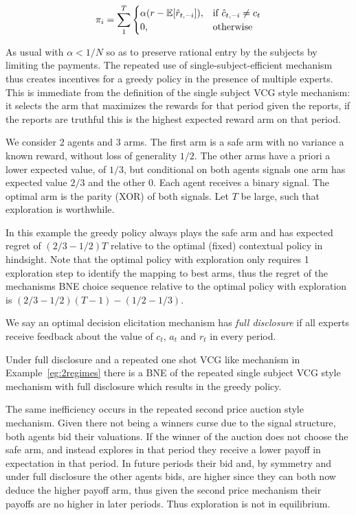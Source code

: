 \[
    \pi_i = \sum_1^T 
\begin{cases}
    \alpha (r - \expec[\hat{r}_{t,-i}]) ,& \text{if } \hat{c}_{t,-i} \neq c_t\\
    0,              & \text{otherwise}
\end{cases}
\]

As usual with $\alpha < 1/N$ so as to preserve rational entry by the subjects by limiting the payments.
The repeated use of single-subject-efficient mechanism thus creates incentives for a greedy policy in the presence of multiple experts.
This is immediate from the definition of the single subject VCG style mechanism: it selects the arm that maximizes the rewards for that period given the reports, if the reports are truthful this is the highest expected reward arm on that period.



\begin{eg}\label{eg:2regimes}
We consider 2 agents and 3 arms. The first arm is a safe arm with no variance a known reward, without loss of generality $1/2$. The other arms have a priori a lower expected value, of $1/3$, but conditional on both agents signals one arm has expected value $2/3$ and the other $0$. 
Each agent receives a binary signal. The optimal arm is the parity (XOR) of both signals. Let $T$ be large, such that exploration is worthwhile.
\end{eg}

In this example the greedy policy always plays the safe arm and has expected  regret of $(2/3 - 1/2)T$ relative to the optimal (fixed) contextual policy in hindsight.
 Note that the optimal policy with exploration only requires 1 exploration step to identify the mapping to best arms, thus the regret of the mechanisms BNE choice sequence relative to the optimal policy with exploration is $(2/3 - 1/2)(T-1) - (1/2-1/3) $. 

\begin{defn}
  We say an optimal decision elicitation mechanism has \emph{full disclosure} if all experts receive feedback about the value of $c_t$, $a_t$ and $r_t$ in every period.
 \end{defn}


Under full disclosure and a repeated one shot VCG like mechanism in Example~\ref{eg:2regimes} there is a BNE of the repeated single subject VCG style mechanism with full disclosure which results in the greedy policy.

The same inefficiency occurs in the repeated second price auction style mechanism.
Given there not being a winners curse due to the signal structure, both agents bid their valuations. If the winner of the auction does not choose the safe arm, and instead explores in that period they receive a lower payoff in expectation in that period. In future periods their bid and, by symmetry and under full disclosure the other agents bids, are higher since they can both now deduce the higher payoff arm, thus given the second price mechanism their payoffs are no higher in later periods. Thus exploration is not in equilibrium. 


